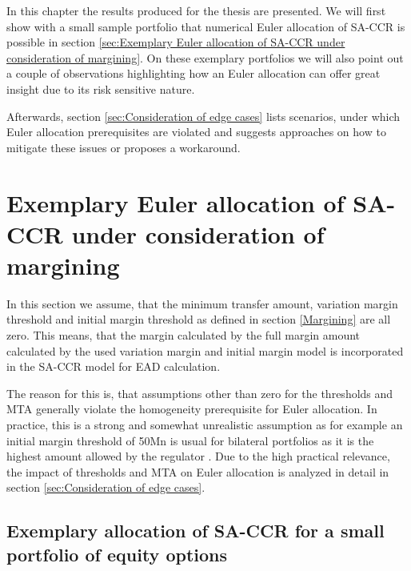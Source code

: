 \documentclass[../Thesis_AHoecherl.tex]{subfiles}
\begin{document}
    In this chapter the results produced for the thesis are presented. We will first show with a small sample portfolio that numerical Euler allocation of \gls{SA-CCR} is possible in section \ref{sec:Exemplary Euler allocation of SA-CCR under consideration of margining}. On these exemplary portfolios we will also point out a couple of observations highlighting how an Euler allocation can offer great insight due to its risk sensitive nature.

    Afterwards, section \ref{sec:Consideration of edge cases} lists scenarios, under which Euler allocation prerequisites are violated and suggests approaches on how to mitigate these issues or proposes a workaround.

    \section{Exemplary Euler allocation of SA-CCR under consideration of margining\label{sec:Exemplary Euler allocation of SA-CCR under consideration of margining}}

    In this section we assume, that the minimum transfer amount, variation margin threshold and initial margin threshold as defined in section \ref{Margining} are all zero. This means, that the margin calculated by the full margin amount calculated by the used variation margin and initial margin model is incorporated in the \gls{SA-CCR} model for \gls{EAD} calculation.

    The reason for this is, that assumptions other than zero for the thresholds and \gls{MTA} generally violate the homogeneity prerequisite for Euler allocation. In practice, this is a strong and somewhat unrealistic assumption as for example an initial margin threshold of 50Mn is usual for bilateral portfolios as it is the highest amount allowed by the regulator \cite[Requirement 2.2]{BCBS_MarginRequirements}. Due to the high practical relevance, the impact of thresholds and \gls{MTA} on Euler allocation is analyzed in detail in section \ref{sec:Consideration of edge cases}.   

    \subsection{Exemplary allocation of SA-CCR for a small portfolio of equity options\label{sec:Exemplary allocation of SA-CCR for a small portoflio of equity options}}

\end{document}
